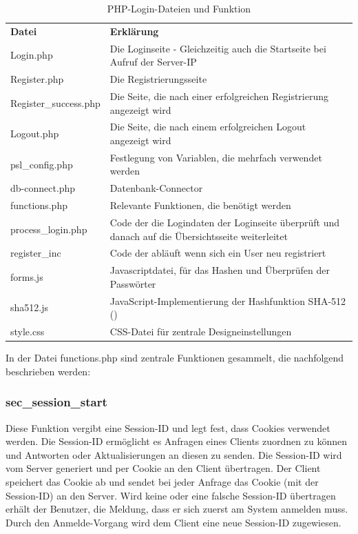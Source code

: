 \begin{table}
\caption{PHP-Login-Dateien und Funktion}
\label{tab:Login-Dateien}
\begin{tabular}{p{} p{}}
\textbf{Datei} 				& \textbf{Erklärung} \\
Login.php 						& Die Loginseite - Gleichzeitig auch die Startseite bei Aufruf der Server-IP\\
Register.php 					& Die Registrierungsseite \\
Register\_success.php & Die Seite, die nach einer erfolgreichen Registrierung angezeigt wird \\
Logout.php 						& Die Seite, die nach einem erfolgreichen Logout angezeigt wird \\
psl\_config.php 			& Festlegung von Variablen, die mehrfach verwendet werden \\
db-connect.php 				& Datenbank-Connector \\
functions.php 				& Relevante Funktionen, die benötigt werden \\
process\_login.php 		& Code der die Logindaten der Loginseite überprüft und danach auf die Übersichtsseite weiterleitet \\
register\_inc 				& Code der abläuft wenn sich ein User neu registriert \\
forms.js 							& Javascriptdatei, für das Hashen und Überprüfen der Passwörter \\
sha512.js 						& JavaScript-Implementierung der Hashfunktion SHA-512 (\cite{sha512js:online})\\
style.css 						& CSS-Datei für zentrale Designeinstellungen \\
 \end{tabular}
\end{table}

In der Datei functions.php sind zentrale Funktionen gesammelt, die nachfolgend
beschrieben werden:

\subsubsection{sec\_session\_start}
Diese Funktion vergibt eine Session-ID und legt fest, dass Cookies verwendet werden. Die Session-ID ermöglicht es Anfragen eines Clients zuordnen zu können und Antworten oder Aktualisierungen an diesen zu senden. Die Session-ID wird vom Server generiert und per Cookie an den Client übertragen. Der Client speichert das Cookie ab und sendet bei jeder Anfrage das Cookie (mit der Session-ID) an den Server. Wird keine oder eine falsche Session-ID übertragen erhält der Benutzer, die Meldung, dass er sich zuerst am System anmelden muss. Durch den Anmelde-Vorgang wird dem Client eine neue Session-ID zugewiesen.

